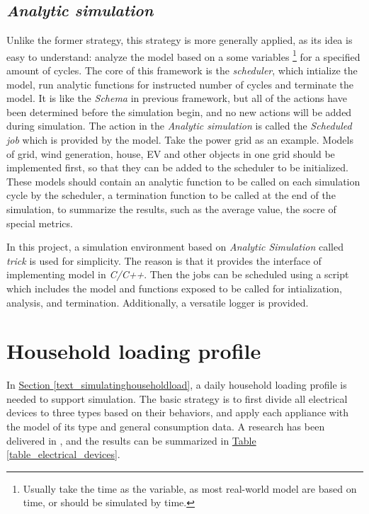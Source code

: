\documentclass[12pt,a4paper]{report}
\begin{document}
        \subsection{\emph{Analytic simulation}}
        \label{text_nasa_trick}
        Unlike the former strategy, this strategy is more generally applied, as its idea is easy to understand: analyze the model based on a some variables \footnote{Usually take the time as the variable, as most real-world model are based on time, or should be simulated by time.} for a specified amount of cycles. The core of this framework is the \emph{scheduler}, which intialize the model, run analytic functions for instructed number of cycles and terminate the model. It is like the \emph{Schema} in previous framework, but all of the actions have been determined before the simulation begin, and no new actions will be added during simulation. The action in the \emph{Analytic simulation} is called the \emph{Scheduled job} which is provided by the model.
        Take the power grid as an example. Models of grid, wind generation, house, EV and other objects in one grid should be implemented first, so that they can be added to the scheduler to be initialized. These models should contain an analytic function to be called on each simulation cycle by the scheduler, a termination function to be called at the end of the simulation, to summarize the results, such as the average value, the socre of special metrics.

        In this project, a simulation environment based on \emph{Analytic Simulation} called \emph{trick} \cite{website:trick} is used for simplicity. The reason is that it provides the interface of implementing model in \emph{C/C++}. Then the jobs can be scheduled using a script which includes the model and functions exposed to be called for intialization, analysis, and termination. Additionally, a versatile logger is provided. 

        \section{Household loading profile}
        In \hyperref[text_simulatinghouseholdload]{Section \ref*{text_simulatinghouseholdload}}, a daily household loading profile is needed to support simulation. The basic strategy is to first divide all electrical devices to three types based on their behaviors, and apply each appliance with the model of its type and general consumption data. A research has been delivered in \cite{paper:devicestypes}, and the results can be summarized in \hyperref[table_electrical_devices]{Table \ref*{table_electrical_devices}}.
\end{document}
